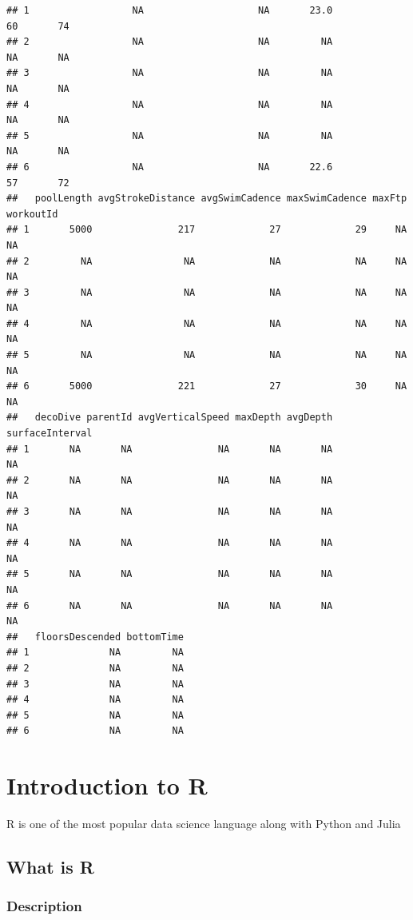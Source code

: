 \documentclass[
]{book}
\begin{document}
\begin{verbatim}
## 1                  NA                    NA       23.0            60       74
## 2                  NA                    NA         NA            NA       NA
## 3                  NA                    NA         NA            NA       NA
## 4                  NA                    NA         NA            NA       NA
## 5                  NA                    NA         NA            NA       NA
## 6                  NA                    NA       22.6            57       72
##   poolLength avgStrokeDistance avgSwimCadence maxSwimCadence maxFtp workoutId
## 1       5000               217             27             29     NA        NA
## 2         NA                NA             NA             NA     NA        NA
## 3         NA                NA             NA             NA     NA        NA
## 4         NA                NA             NA             NA     NA        NA
## 5         NA                NA             NA             NA     NA        NA
## 6       5000               221             27             30     NA        NA
##   decoDive parentId avgVerticalSpeed maxDepth avgDepth surfaceInterval
## 1       NA       NA               NA       NA       NA              NA
## 2       NA       NA               NA       NA       NA              NA
## 3       NA       NA               NA       NA       NA              NA
## 4       NA       NA               NA       NA       NA              NA
## 5       NA       NA               NA       NA       NA              NA
## 6       NA       NA               NA       NA       NA              NA
##   floorsDescended bottomTime
## 1              NA         NA
## 2              NA         NA
## 3              NA         NA
## 4              NA         NA
## 5              NA         NA
## 6              NA         NA
\end{verbatim}

\hypertarget{intro_r}{%
\chapter{Introduction to R}\label{intro_r}}

R is one of the most popular data science language along with Python and Julia

\hypertarget{what-is-r}{%
\section{What is R}\label{what-is-r}}

\hypertarget{description}{%
\subsection{Description}\label{description}}
\end{document}
